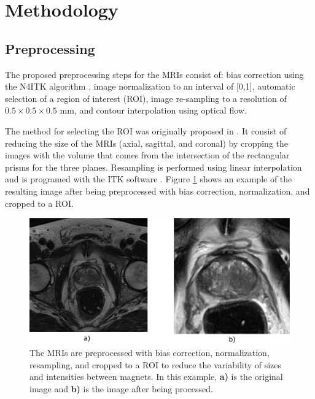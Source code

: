 \section{Methodology}
\label{sec:methods}



\subsection{Preprocessing}
\label{subsec:prepro}
The proposed preprocessing steps for the MRIs consist of: bias correction using the N4ITK algorithm \cite{n4itk}, image normalization to an interval of [0,1], automatic selection of a region of interest (ROI), image re-sampling to a resolution of $0.5 \times 0.5 \times 0.5$ mm, and contour interpolation using optical flow.  

The method for selecting the ROI was originally proposed in \cite{anneke}. It consist of reducing the size of the MRIs (axial, sagittal, and coronal) by cropping the images with the volume that comes from the intersection of the rectangular prisms for the three planes. Resampling is performed using linear interpolation and is programed with the ITK software \cite{itk}.  Figure \ref{fig_1} shows an example of the resulting image after being preprocessed with bias correction, normalization, and cropped to a ROI. 

\begin{figure}[h]
    \centering
    \includegraphics[totalheight=.25\textheight]{figures/Figure1.eps}
    \caption{The MRIs are preprocessed with bias correction, normalization, resampling, and cropped to a ROI to reduce the variability of sizes and intensities between magnets. In this example, \textbf{a)} is the original image and \textbf{b)} is the image after being processed.} 
    \label{fig_1}
\end{figure}

